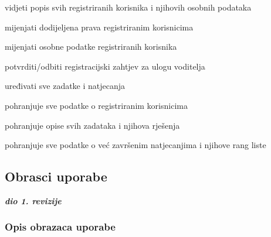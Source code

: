 \begin{packed_enum}
\begin{packed_enum}
		\item vidjeti popis svih registriranih korisnika i njihovih osobnih podataka
		\item mijenjati dodijeljena prava registriranim korisnicima
		\item mijenjati osobne podatke registriranih korisnika
		\item potvrditi/odbiti registracijski zahtjev za ulogu voditelja
		\item uređivati sve zadatke i natjecanja
		
	\end{packed_enum}
	
	\item  {}
	
	\begin{packed_enum}
		
		\item pohranjuje sve podatke o registriranim korisnicima
		\item pohranjuje opise svih zadataka i njihova rješenja
		\item pohranjuje sve podatke o već završenim natjecanjima i njihove rang liste
		
	\end{packed_enum}
\end{packed_enum}

\eject 
			
				
			\subsection{Obrasci uporabe}
				
				\textbf{\textit{dio 1. revizije}}
				
				\subsubsection{Opis obrazaca uporabe}
				
